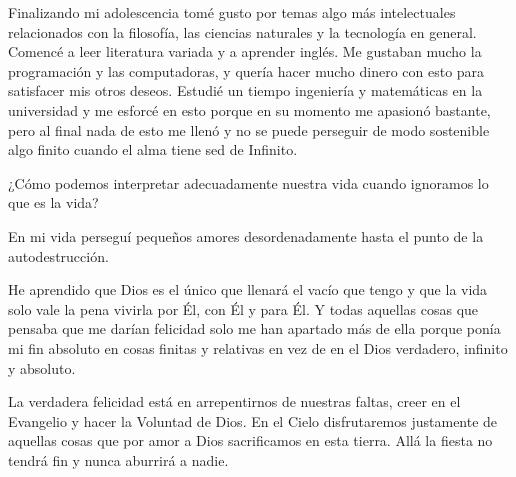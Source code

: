 \documentclass[12pt]{article}
\begin{document}
Finalizando mi adolescencia tomé gusto por temas algo más intelectuales
relacionados con la filosofía, las ciencias naturales y la tecnología en
general. Comencé a leer literatura variada y a aprender inglés. Me gustaban
mucho la programación y las computadoras, y quería hacer mucho dinero con esto
para satisfacer mis otros deseos. Estudié un tiempo ingeniería y matemáticas en
la universidad y me esforcé en esto porque en su momento me apasionó bastante,
pero al final nada de esto me llenó y no se puede perseguir de modo sostenible
algo finito cuando el alma tiene sed de Infinito.

¿Cómo podemos interpretar adecuadamente nuestra vida cuando ignoramos lo que es
la vida?

En mi vida perseguí pequeños amores desordenadamente hasta el punto de la
autodestrucción. 

He aprendido que Dios es el único que llenará el vacío que tengo y que la vida
solo vale la pena vivirla por Él, con Él y para Él. Y todas aquellas cosas que
pensaba que me darían felicidad solo me han apartado más de ella porque ponía mi
fin absoluto en cosas finitas y relativas en vez de en el Dios verdadero,
infinito y absoluto.

La verdadera felicidad está en arrepentirnos de nuestras faltas, creer en el
Evangelio y hacer la Voluntad de Dios. En el Cielo disfrutaremos justamente de
aquellas cosas que por amor a Dios sacrificamos en esta tierra. Allá la fiesta
no tendrá fin y nunca aburrirá a nadie.
\end{document}
